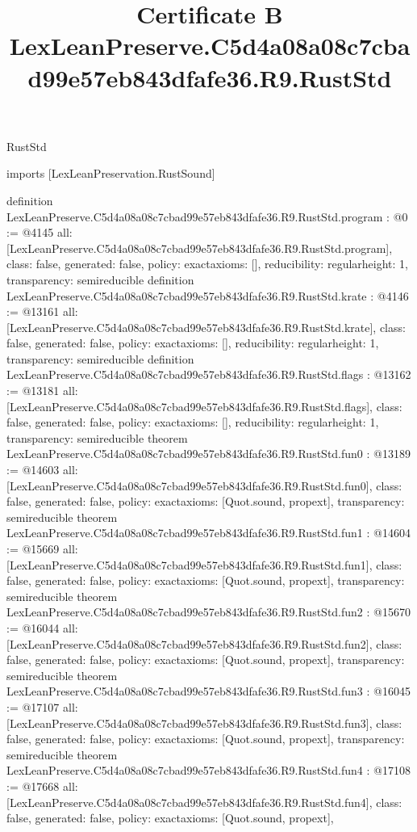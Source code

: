 \begin{lexlean}{RustStd}
\title{Certificate B LexLeanPreserve.C5d4a08a08c7cbad99e57eb843dfafe36.R9.RustStd}
\begin{coremodule}
imports [LexLeanPreservation.RustSound]

definition LexLeanPreserve.C5d4a08a08c7cbad99e57eb843dfafe36.R9.RustStd.program : @0 := @4145 {
  all: [LexLeanPreserve.C5d4a08a08c7cbad99e57eb843dfafe36.R9.RustStd.program],
  class: false,
  generated: false,
  policy: exact{axioms: []},
  reducibility: regular{height: 1},
  transparency: semireducible
}
definition LexLeanPreserve.C5d4a08a08c7cbad99e57eb843dfafe36.R9.RustStd.krate : @4146 := @13161 {
  all: [LexLeanPreserve.C5d4a08a08c7cbad99e57eb843dfafe36.R9.RustStd.krate],
  class: false,
  generated: false,
  policy: exact{axioms: []},
  reducibility: regular{height: 1},
  transparency: semireducible
}
definition LexLeanPreserve.C5d4a08a08c7cbad99e57eb843dfafe36.R9.RustStd.flags : @13162 := @13181 {
  all: [LexLeanPreserve.C5d4a08a08c7cbad99e57eb843dfafe36.R9.RustStd.flags],
  class: false,
  generated: false,
  policy: exact{axioms: []},
  reducibility: regular{height: 1},
  transparency: semireducible
}
theorem LexLeanPreserve.C5d4a08a08c7cbad99e57eb843dfafe36.R9.RustStd.fun0 : @13189 := @14603 {
  all: [LexLeanPreserve.C5d4a08a08c7cbad99e57eb843dfafe36.R9.RustStd.fun0],
  class: false,
  generated: false,
  policy: exact{axioms: [Quot.sound, propext]},
  transparency: semireducible
}
theorem LexLeanPreserve.C5d4a08a08c7cbad99e57eb843dfafe36.R9.RustStd.fun1 : @14604 := @15669 {
  all: [LexLeanPreserve.C5d4a08a08c7cbad99e57eb843dfafe36.R9.RustStd.fun1],
  class: false,
  generated: false,
  policy: exact{axioms: [Quot.sound, propext]},
  transparency: semireducible
}
theorem LexLeanPreserve.C5d4a08a08c7cbad99e57eb843dfafe36.R9.RustStd.fun2 : @15670 := @16044 {
  all: [LexLeanPreserve.C5d4a08a08c7cbad99e57eb843dfafe36.R9.RustStd.fun2],
  class: false,
  generated: false,
  policy: exact{axioms: [Quot.sound, propext]},
  transparency: semireducible
}
theorem LexLeanPreserve.C5d4a08a08c7cbad99e57eb843dfafe36.R9.RustStd.fun3 : @16045 := @17107 {
  all: [LexLeanPreserve.C5d4a08a08c7cbad99e57eb843dfafe36.R9.RustStd.fun3],
  class: false,
  generated: false,
  policy: exact{axioms: [Quot.sound, propext]},
  transparency: semireducible
}
theorem LexLeanPreserve.C5d4a08a08c7cbad99e57eb843dfafe36.R9.RustStd.fun4 : @17108 := @17668 {
  all: [LexLeanPreserve.C5d4a08a08c7cbad99e57eb843dfafe36.R9.RustStd.fun4],
  class: false,
  generated: false,
  policy: exact{axioms: [Quot.sound, propext]},
}
\end{coremodule}
\end{lexlean}
